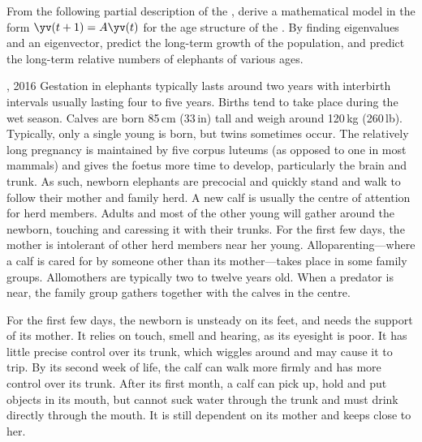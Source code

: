 \begin{exercise} \label{ex:} 
From the following partial description of the , 
derive a mathematical model in the form \(\yv(t+1)=A\yv(t)\) for the age structure of the .
By finding eigenvalues and an eigenvector, predict the long-term growth of the population, and predict the long-term relative numbers of elephants of various ages.
\begin{quoted}{, 2016}
Gestation in elephants typically lasts around two years with interbirth intervals usually lasting four to five years. Births tend to take place during the wet season. Calves are born 85\,cm (33\,in) tall and weigh around 120\,kg (260\,lb). Typically, only a single young is born, but twins sometimes occur.  The relatively long pregnancy is maintained by five corpus luteums (as opposed to one in most mammals) and gives the foetus more time to develop, particularly the brain and trunk. As such, newborn elephants are precocial and quickly stand and walk to follow their mother and family herd.  A new calf is usually the centre of attention for herd members.  Adults and most of the other young will gather around the newborn, touching and caressing it with their trunks.  For the first few days, the mother is intolerant of other herd members near her young.  Alloparenting---where a calf is cared for by someone other than its mother---takes place in some family groups.  Allomothers are typically two to twelve years old. When a predator is near, the family group gathers together with the calves in the centre.

For the first few days, the newborn is unsteady on its feet, and needs the support of its mother. It relies on touch, smell and hearing, as its eyesight is poor. It has little precise control over its trunk, which wiggles around and may cause it to trip. By its second week of life, the calf can walk more firmly and has more control over its trunk. After its first month, a calf can pick up, hold and put objects in its mouth, but cannot suck water through the trunk and must drink directly through the mouth. It is still dependent on its mother and keeps close to her.


\end{quoted}
\end{exercise}
